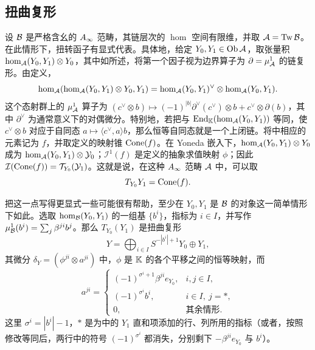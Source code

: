 \subsection{扭曲复形}\label{sec:5f}
设 $\mathcal B$ 是严格含幺的 $A_\infty$ 范畴，其链层次的 $\hom$ 空间有限维，并取 $\mathcal A=\operatorname{Tw}\mathcal B$。在此情形下，扭转函子有显式代表。具体地，给定 $Y_0,Y_1\in\operatorname{Ob}\mathcal A$，取张量积 $\hom_{\mathcal A}(Y_0,Y_1)\otimes Y_0$，其中如所述，将第一个因子视为边界算子为 $\partial=\mu^1_{\mathcal A}$ 的链复形。由定义，
\begin{equation}\label{eq:5.15}
\hom_{\mathcal A}(\hom_{\mathcal A}(Y_0,Y_1)\otimes Y_0,Y_1)=\hom_{\mathcal A}(Y_0,Y_1)^{\vee}\otimes\hom_{\mathcal A}(Y_0,Y_1).
\end{equation}
这个态射群上的 $\mu^1_{\mathcal A}$ 算子为 $(c^{\vee}\otimes b)\mapsto(-1)^{|b|}\partial^{\vee}(c^{\vee})\otimes b+c^{\vee}\otimes\partial(b)$，其中 $\partial^{\vee}$ 为通常意义下的对偶微分。特别地，若把与 $\operatorname{End}_{\mathbb K}(\hom_{\mathcal A}(Y_0,Y_1))$ 等同，使 $c^{\vee}\otimes b$ 对应于自同态 $a\mapsto\langle c^{\vee},a\rangle b$，那么恒等自同态就是一个上闭链。将中相应的元素记为 $f$，并取定义的映射锥 $\operatorname{Cone}(f)$。在 Yoneda 嵌入下，$\hom_{\mathcal A}(Y_0,Y_1)\otimes Y_0$ 成为 $\hom_{\mathcal A}(Y_0,Y_1)\otimes\mathcal Y_0$；$\mathcal I^1(f)$ 是定义的抽象求值映射 $\phi$；因此 $\mathcal I(\operatorname{Cone}(f))=\mathcal T_{Y_0}(\mathcal Y_1)$。这就是说，在这种 $A_\infty$ 范畴 $\mathcal A$ 中，可以取
\begin{equation}\label{eq:5.16}
T_{Y_0}Y_1=\operatorname{Cone}(f).
\end{equation}
\begin{note}\label{st:5.9}
把这一点写得更显式一些可能很有帮助，至少在 $Y_0,Y_1$ 是 $\mathcal B$ 的对象这一简单情形下如此。选取 $\hom_{\mathcal B}(Y_0,Y_1)$ 的一组基 $\{b^i\}$，指标为 $i\in I$，并写作 $\mu^1_{\mathcal B}(b^i)=\sum_j\beta^{ji}b^j$。那么 $T_{Y_0}(Y_1)$ 是扭曲复形
\begin{equation}\label{eq:5.17}
Y=\bigoplus_{i\in I}S^{-|b^i|+1}Y_0\oplus Y_1,
\end{equation}
其微分 $\delta_Y=(\phi^{ji}\otimes a^{ji})$ 中，$\phi$ 是 $\mathbb K$ 的各个平移之间的恒等映射，而
\begin{equation}\label{eq:5.18}
a^{ji}=\begin{cases}
(-1)^{\sigma^i+1}\beta^{ji}e_{Y_0},&i,j\in I,\\
(-1)^{\sigma^i}b^i,&i\in I,\ j=*,\\
0,&\text{其余情形}.
\end{cases}
\end{equation}
这里 $\sigma^i=|b^i|-1$，$*$ 是为中的 $Y_1$ 直和项添加的行、列所用的指标（或者，按照修改等同后，两行中的符号 $(-1)^{\sigma^i}$ 都消失，分别剩下 $-\beta^{ji}e_{Y_0}$ 与 $b^i$）。
\end{note}
